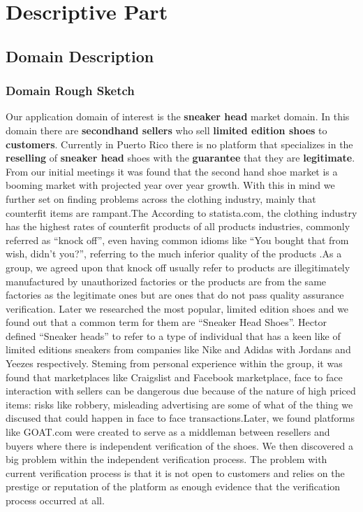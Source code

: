 \chapter{Descriptive Part}
\section{Domain Description}
\subsection{Domain Rough Sketch}
Our application domain of interest is the \textbf{sneaker head} market domain. In this domain there are \textbf{secondhand sellers} who sell \textbf{limited edition shoes} to \textbf{customers}. Currently in Puerto Rico there is no platform that specializes in the \textbf{reselling} of \textbf{sneaker head} shoes with the \textbf{guarantee} that they are \textbf{legitimate}. From our initial meetings it was found that the second hand shoe market is a booming market with projected year over year growth. With this in mind we further set on finding problems across the clothing industry, mainly that counterfit items are rampant.The According to statista.com, the clothing industry has the highest rates of counterfit products of all products industries, commonly referred as ``knock off'', even having common idioms like ``You bought that from wish, didn't you?'', referring to the much inferior quality of the products \cite{InfographicIndustriesMost2019}.As a group, we agreed upon that knock off usually refer to products are illegitimately manufactured by unauthorized factories or the products are from the same factories as the legitimate ones but are ones that do not pass quality assurance verification. Later we researched the most popular, limited edition shoes and we found out that a common term for them are ``Sneaker Head Shoes''. Hector defined ``Sneaker heads'' to refer to a type of individual that has a keen like of limited editions sneakers from companies like Nike and Adidas with Jordans and Yeezes respectively. Steming from personal experience within the group, it was found that marketplaces like Craigslist and Facebook marketplace, face to face interaction with sellers can be dangerous due because of the nature of high priced items: risks like robbery, misleading advertising are some of what of the thing we discused that could happen in face to face transactions.Later, we found platforms like GOAT.com were created to serve as a middleman between resellers and buyers where there is independent verification of the shoes. We then discovered a big problem within the independent verification process. The problem with  current verification process is that it is not open to customers and relies on the prestige or reputation of the platform as enough evidence that the verification process occurred at all.
